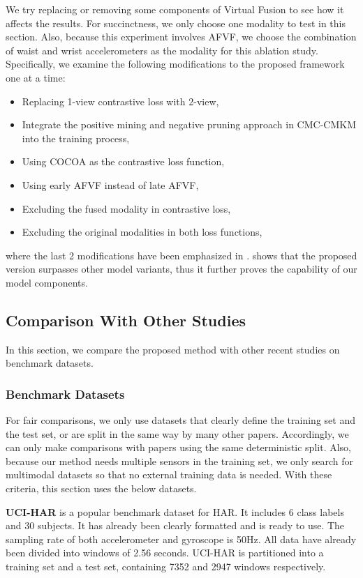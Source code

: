 \documentclass[conference]{IEEEtran}
\begin{document}
We try replacing or removing some components of Virtual Fusion to see how it affects the results. For succinctness, we only choose one modality to test in this section. Also, because this experiment involves AFVF, we choose the combination of waist and wrist accelerometers as the modality for this ablation study. Specifically, we examine the following modifications to the proposed framework one at a time:
\begin{itemize}
\item Replacing 1-view contrastive loss with 2-view,
\item Integrate the positive mining and negative pruning approach in CMC-CMKM \cite{Brinzea2022} into the training process,
\item Using COCOA \cite{Deldari2022} as the contrastive loss function,
\item Using early AFVF instead of late AFVF,
\item Excluding the fused modality in contrastive loss,
\item Excluding the original modalities in both loss functions,
\end{itemize}
where the last 2 modifications have been emphasized in .  shows that the proposed version surpasses other model variants, thus it further proves the capability of our model components.

\subsection{Comparison With Other Studies}
\label{sec: Comparison With Other Studies}
In this section, we compare the proposed method with other recent studies on benchmark datasets.

\subsubsection{Benchmark Datasets}
For fair comparisons, we only use datasets that clearly define the training set and the test set, or are split in the same way by many other papers. Accordingly, we can only make comparisons with papers using the same deterministic split. Also, because our method needs multiple sensors in the training set, we only search for multimodal datasets so that no external training data is needed. With these criteria, this section uses the below datasets.

\textbf{UCI-HAR} \cite{Anguita2013} is a popular benchmark dataset for HAR. It includes 6 class labels and 30 subjects. It has already been clearly formatted and is ready to use. The sampling rate of both accelerometer and gyroscope is 50Hz. All data have already been divided into windows of 2.56 seconds. UCI-HAR is partitioned into a training set and a test set, containing 7352 and 2947 windows respectively.
\end{document}
